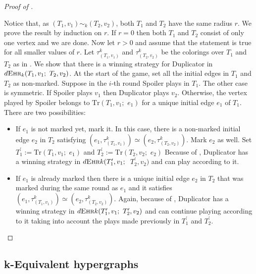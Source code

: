 \documentclass[12pt,notitlepage,a4paper]{article}
\theoremstyle{definition}
\newcommand{\morph}[1]{\sim_#1}
\newcommand{\ehr}{\textsc{Ehr}}
\begin{document}
\begin{proof}[Proof of ]~ \par
	Notice that, as $(T_1,v_1)\morph{k} (T_2,v_2)$, both $T_1$ and
	$T_2$ have the same radius $r$.
	We prove the result by induction on $r$.
	If $r=0$ then both $T_1$ and $T_2$ consist
	of only one vertex and we are done.
	Now let $r>0$ and assume that the 
	statement is true for all smaller values of $r$.
	Let $\tau^k_{(T_1,v_1)}$ and $\tau^k_{(T_2,v_2)}$ 
	be the colorings over $T_1$ and $T_2$ as in 
	. 
	We show that there is a winning strategy 
	for Duplicator in
	$d\ehr_k(T_1,v_1;\,\, T_2,v_2)$.
	At the start of the game, set all the initial edges
	in $T_1$ and $T_2$ as non-marked. 
	Suppose in the $i$-th round Spoiler plays in 
	$T_1$. The other case is symmetric. 
	If Spoiler plays $v_1$ then Duplicator plays $v_2$.
	Otherwise, the vertex played by Spoiler belongs to
	$\mathrm{Tr}(T_1,v_1;\,\,e_1)$
	for a unique initial edge $e_1$ of $T_1$. 
	There are two possibilities:
	\begin{itemize}[leftmargin=*]
		\item If $e_1$ is not marked yet, mark it. 
		In this case, there is a 
		non-marked initial
		edge $e_2$ in $T_2$ satisfying 
		$\left(e_1,\tau^k_{(T_1,v_1)}\right)\simeq
		\left(e_2,\tau^k_{(T_2,v_2)}  \right)$.
		Mark $e_2$ as well. 
		Set $T^\prime_1:=\mathrm{Tr}(T_1,v_1;\,\,e_1)$
		and
		$T^\prime_2:=\mathrm{Tr}(T_2,v_2;\,\,e_2)$
		Because of
		, Duplicator
		has a winning strategy in
		$ d\ehr{k}(T^\prime_1, v_1;$ $\,\, T^\prime_2,v_2)$
		and can play according to it.
		\item If $e_1$ is already marked then there is
		a unique initial edge $e_2$ in $T_2$ that was 
		marked during the same round as $e_1$ and it satisfies 
		$\left(e_1,\tau^k_{(T_1,v_1)}\right)\simeq
		\left(e_2,\tau^k_{(T_2,v_2)}  \right)$.	
		Again, because of , 
		Duplicator has a winning strategy in
		$d\ehr{k}(T^\prime_1, v_1; \,\, T^\prime_2,v_2)$
		and can continue playing according to it taking
		into account the plays made previously in 
		$T^\prime_1$ and $T^\prime_2$.	
	\end{itemize}
\vspace{-2em}
\end{proof}

\subsection{k-Equivalent hypergraphs} \label{sect:equivunicycles}
	
\end{document}
